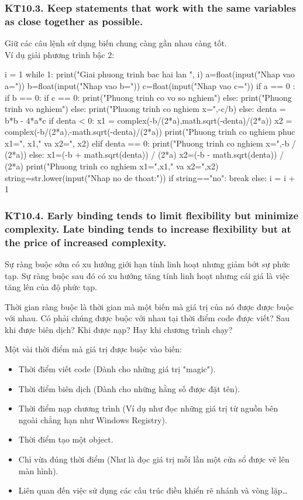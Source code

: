 \documentclass[12pt]{report}
\begin{document}
\subsubsection{KT10.3. Keep statements that work with the same variables as close together as possible.}
Giữ các câu lệnh sử dụng biến chung càng gần nhau càng tốt. \\
Ví dụ giải phương trình bậc 2:
\begin{python}
i = 1
while 1:
    print("Giai phuong trinh bac hai lan ", i)
    a=float(input("Nhap vao a=\n"))
    b=float(input("Nhap vao b=\n"))
    c=float(input("Nhap vao c=\n"))
    if a == 0 :
        if b == 0:
            if c == 0:
                print("Phuong trinh co vo so nghiem")
            else:
                print("Phuong trinh vo nghiem")
        else:
            print("Phuong trinh co nghiem x=",-c/b)
    else:
        denta = b*b - 4*a*c
        if denta < 0:
            x1 = complex(-b/(2*a),math.sqrt(-denta)/(2*a))
            x2 = complex(-b/(2*a),-math.sqrt(-denta)/(2*a))
            print("Phuong trinh co nghiem phuc x1=", x1," va x2=", x2)
        elif denta == 0:
            print("Phuong trinh co nghiem x=",-b / (2*a))
        else:
            x1=(-b + math.sqrt(denta)) / (2*a)
            x2=(-b - math.sqrt(denta)) / (2*a)
            print("Phuong trinh co nghiem x1=",x1," va x2=",x2)
    string=str.lower(input("Nhap no de thoat:\n"))
    if string=="no":
        break
    else:
        i = i + 1
\end{python}
\subsubsection{KT10.4. Early binding tends to limit flexibility but minimize complexity. Late binding tends to increase flexibility but at the price of increased complexity.}
Sự ràng buộc sớm có xu hướng giới hạn tính linh hoạt nhưng giảm bớt sự phức tạp. Sự ràng buộc sau đó có xu hướng tăng tính linh hoạt nhưng cái giá là việc tăng lên của độ phức tạp. 

Thời gian ràng buộc là thời gian mà một biến mà giá trị của nó được được buộc với nhau.  Có phải chúng được buộc với nhau tại thời điểm code được viết? Sau khi được biên dịch? Khi được nạp? Hay khi chương trình chạy?
\vspace*{3mm}

Một vài thời điểm mà giá trị được buộc vào biến: 
\begin{itemize}
	\item Thời điểm viết code (Dành cho những giá trị "magic").
	\item Thời điểm biên dịch (Dành cho những hằng số được đặt tên).
	\item Thời điểm nạp chương trình (Ví dụ như đọc những giá trị từ nguồn bên ngoài chẳng hạn như Windows Registry).
	\item Thời điểm tạo một object.
	\item Chỉ vừa đúng thời điểm (Như là đọc giá trị mỗi lần một cửa sổ được vẽ lên màn hình). 
	\item Liên quan đến việc sử dụng các cấu trúc điều khiển rẽ nhánh và vòng lặp…
\end{itemize}
\end{document}

